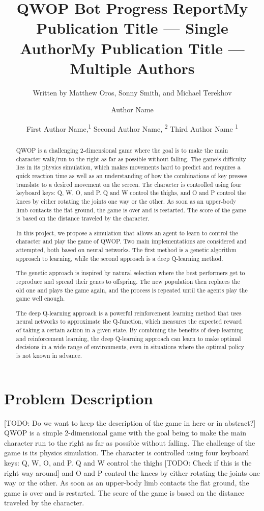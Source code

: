 \documentclass[letterpaper]{article} %
\title{QWOP Bot Progress Report}
\author{
    Written by Matthew Oros, Sonny Smith, and Michael Terekhov \\ 
}
\title{My Publication Title --- Single Author}
\author {
    Author Name \\
}
\title{My Publication Title --- Multiple Authors}
\author {
    First Author Name,\textsuperscript{\rm 1}
    Second Author Name, \textsuperscript{\rm 2}
    Third Author Name \textsuperscript{\rm 1} \\
}
\begin{document}
\maketitle

\begin{abstract}
QWOP is a challenging 2-dimensional game where the goal is to make the main character walk/run to the right as far as possible without falling. The game's difficulty lies in its physics simulation, which makes movements hard to predict and requires a quick reaction time as well as an understanding of how the combinations of key presses translate to a desired movement on the screen. The character is controlled using four keyboard keys: Q, W, O, and P. Q and W control the thighs, and O and P control the knees by either rotating the joints one way or the other. As soon as an upper-body limb contacts the flat ground, the game is over and is restarted. The score of the game is based on the distance traveled by the character.

\par In this project, we propose a simulation that allows an agent to learn to control the character and play the game of QWOP. Two main implementations are considered and attempted, both based on neural networks. The first method is a genetic algorithm approach to learning, while the second approach is a deep Q-learning method.

\par The genetic approach is inspired by natural selection where the best performers get to reproduce and spread their genes to offspring. The new population then replaces the old one and plays the game again, and the process is repeated until the agents play the game well enough.

\par The deep Q-learning approach is a powerful reinforcement learning method that uses neural networks to approximate the Q-function, which measures the expected reward of taking a certain action in a given state. By combining the benefits of deep learning and reinforcement learning, the deep Q-learning approach can learn to make optimal decisions in a wide range of environments, even in situations where the optimal policy is not known in advance.
\end{abstract}

\section{Problem Description}
[TODO: Do we want to keep the description of the game in here or in abstract?] QWOP is a simple 2-dimensional game with the goal being to make the main character run to the right as far as possible without falling. The challenge of the game is its physics simulation. The character is controlled using four keyboard keys: Q, W, O, and P. Q and W control the thighs [TODO: Check if this is the right way around] and O and P control the knees by either rotating the joints one way or the other. As soon as an upper-body limb contacts the flat ground, the game is over and is restarted. The score of the game is based on the distance traveled by the character.
\end{document}
